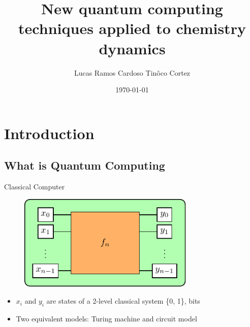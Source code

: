 \documentclass[professionalfonts]{beamer}
\title[Dissertation defence]{New quantum computing techniques applied to chemistry dynamics}
\author{Lucas Ramos Cardoso Tin\^{o}co Cortez}
\institute{Texas Tech University}
\date{\today}
\begin{document}
\begin{frame}
	\titlepage
\end{frame}



\begin{frame}
\tableofcontents	%
\end{frame}



\section{\textbf{Introduction}}
\subsection{\textbf{What is Quantum Computing}}

\begin{frame}{Classical Computer}
\begin{figure}[b]
	\centering
	\includegraphics[width=0.75\textwidth]{img/classical}
\end{figure}
	\begin{itemize}
		\item $x_i$ and $y_i$ are states of a 2-level classical system \{0, 1\}, bits
		\item Two equivalent models: Turing machine and circuit model
	\end{itemize}
\end{frame}

\end{document}
